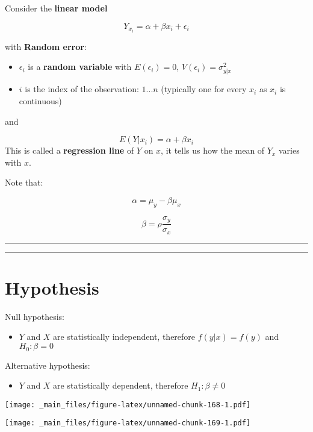 \documentclass[
]{book}
\providecommand{\tightlist}{%
  \setlength{\itemsep}{0pt}\setlength{\parskip}{0pt}}
\begin{document}
Consider the \textbf{linear model}

\[Y_{x_i} = \alpha + \beta x_i +\epsilon_{i}\]

with \textbf{Random error}:

\begin{itemize}
\item
  \(\epsilon_{i}\) is a \textbf{random variable} with \(E(\epsilon_{i})=0\), \(V(\epsilon_{i})=\sigma_{y|x}^2\)
\item
  \(i\) is the index of the observation: \(1...n\) (typically one for every \(x_i\) as \(x_i\) is continuous)
\end{itemize}

and

\[E(Y|x_i)=\alpha + \beta x_i\]
This is called a \textbf{regression line} of \(Y\) on \(x\), it tells us how the mean of \(Y_x\) varies with \(x\).

Note that:

\[\alpha=\mu_y-\beta\mu_x\]

\[\beta=\rho\frac{\sigma_y}{\sigma_x}\]

\begin{center}\rule{0.5\linewidth}{0.5pt}\end{center}

\begin{center}\rule{0.5\linewidth}{0.5pt}\end{center}

\hypertarget{hypothesis-6}{%
\section{Hypothesis}\label{hypothesis-6}}

Null hypothesis:

\begin{itemize}
\tightlist
\item
  \(Y\) and \(X\) are statistically independent, therefore \(f(y|x)=f(y)\) and \(H_0: \beta=0\)
\end{itemize}

Alternative hypothesis:

\begin{itemize}
\tightlist
\item
  \(Y\) and \(X\) are statistically dependent, therefore \(H_1: \beta\neq 0\)
\end{itemize}

\texttt{[image: \_main\_files/figure-latex/unnamed-chunk-168-1.pdf]}

\texttt{[image: \_main\_files/figure-latex/unnamed-chunk-169-1.pdf]}
\end{document}
